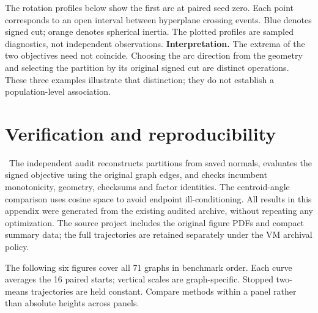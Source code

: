 \documentclass[11pt,a4paper]{article}
\begin{document}
The rotation profiles below show the first arc at paired seed zero. Each point corresponds to an open interval between hyperplane crossing events. Blue denotes signed cut; orange denotes spherical inertia. The plotted profiles are sampled diagnostics, not independent observations.
\clearpage
{}
\textbf{Interpretation.} The extrema of the two objectives need not coincide. Choosing the arc direction from the geometry and selecting the partition by its original signed cut are distinct operations. These three examples illustrate that distinction; they do not establish a population-level association.
\section{Verification and reproducibility}
\AuditFinding\ The independent audit reconstructs partitions from saved normals, evaluates the signed objective using the original graph edges, and checks incumbent monotonicity, geometry, checksums and factor identities. The centroid-angle comparison uses cosine space to avoid endpoint ill-conditioning. All results in this appendix were generated from the existing audited archive, without repeating any optimization. The source project includes the original figure PDFs and compact summary data; the full trajectories are retained separately under the VM archival policy.

The following six figures cover all 71 graphs in benchmark order. Each curve averages the 16 paired starts; vertical scales are graph-specific. Stopped two-means trajectories are held constant. Compare methods within a panel rather than absolute heights across panels.
\clearpage
{}
\clearpage
{}
\clearpage
{}
\clearpage
{}
\clearpage
{}
\end{document}
